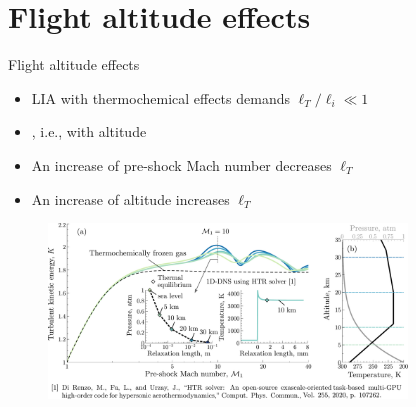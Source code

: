 \documentclass[9pt, aspectratio=1609]{beamer}
\newcommand{\acl}[1]{{\color{cardinalred}{#1}}}
\begin{document}
\section{Flight altitude effects}
\begin{frame}{\large Flight altitude effects}

\begin{itemize}
    \item LIA with thermochemical effects demands $\ell_T / \ell_i \ll 1$
    \item \acl{$\ell_T$ varies with upstream conditions}, i.e., with altitude
    \item An increase of pre-shock Mach number decreases $\ell_T$
    \item An increase of altitude increases $\ell_T$ 
\end{itemize}

\begin{figure}
    \centering
    \includegraphics[width=0.85\textwidth]{figures/aiaa2023/K3D_molarfraction_AIAA2023_altitude_pressure_mod_slides.pdf}
\end{figure}

\end{frame}
\end{document}

